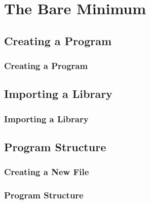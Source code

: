 \section{The Bare Minimum}
\label{sec:bare_minimum}

\subsection{Creating a Program}
\label{sub:creating_a_program}
\begin{frame}
	\frametitle{Creating a Program}
\end{frame}

\subsection{Importing a Library}
\label{sub:importing_a_library}
\begin{frame}
	\frametitle{Importing a Library}
\end{frame}

\subsection{Program Structure}
\label{sub:program_structure}
\begin{frame}
	\frametitle{Creating a New File}
\end{frame}

\begin{frame}
	\frametitle{Program Structure}
\end{frame}